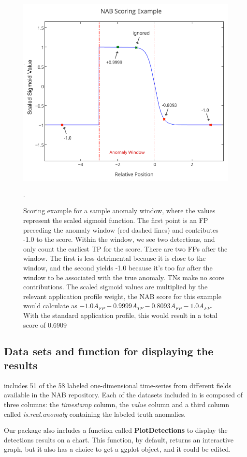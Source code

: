 \documentclass[a4paper]{article}\usepackage[]{graphicx}\usepackage[]{color}
\begin{document}
\begin{figure}[htbp]
\centering
\includegraphics[width=0.7\linewidth]{ScoreExample.PNG}
\caption{Scoring example for a sample anomaly window, where the values represent the scaled sigmoid function. The first point is an FP preceding the anomaly window (red dashed lines) and contributes -1.0 to the score. Within the window, we see two detections, and only count the earliest TP for the score. There are two FPs after the window. The first is less detrimental because it is close to the window, and the second yields -1.0 because it's too far after the window to be associated with the true anomaly. TNs make no score contributions. The scaled sigmoid values are multiplied by the relevant application profile weight, the NAB score for this example would calculate as \( -1.0 A_{FP} + 0.9999 A_{TP} - 0.8093 A_{FP} - 1.0 A_{FP}\). With the standard application profile, this would result in a total score of 0.6909 \cite{7424283}}.
\label{fig:ScoringEx}
\end{figure}

\subsection{Data sets and function for displaying the results} \label{sec:display}

 includes 51 of the 58 labeled one-dimensional time-series from different fields available in the NAB \cite{7424283} repository. Each of the datasets included in  is composed of three columns: the \emph{timestamp} column, the \emph{value} column and a third column called \emph{is.real.anomaly} containing the labeled truth anomalies.

Our package also includes a function called \textbf{PlotDetections} to display the detections results on a chart. This function, by default, returns an interactive graph, but it also has a choice to get a ggplot object, and it could be edited.
\end{document}
